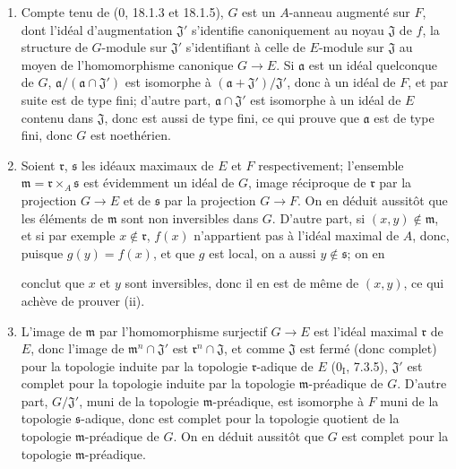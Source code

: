 \begin{enumerate}
  \item[(i)] Compte tenu de ($0$, 18.1.3 et 18.1.5), $G$ est un $A$-anneau augmenté sur $F$, dont l'idéal d'augmentation $\mathfrak J'$ s'identifie canoniquement au noyau $\mathfrak J$ de $f$, la structure de $G$-module sur $\mathfrak J'$ s'identifiant à celle de $E$-module sur $\mathfrak J$ au moyen de l'homomorphisme canonique $G\to E$. Si $\mathfrak a$ est un idéal quelconque de $G$, $\mathfrak a/(\mathfrak a\cap\mathfrak J')$ est isomorphe à $(\mathfrak a+\mathfrak J')/\mathfrak J'$, donc à un idéal de $F$, et par suite est de type fini; d'autre part, $\mathfrak a\cap\mathfrak J'$ est isomorphe à un idéal de $E$ contenu dans $\mathfrak J$, donc est aussi de type fini, ce qui prouve que $\mathfrak a$ est de type fini, donc $G$ est noethérien.
  \item[(ii)] Soient $\mathfrak r$, $\mathfrak s$ les idéaux maximaux de $E$ et $F$ respectivement; l'ensemble $\mathfrak m=\mathfrak r\times_A\mathfrak s$ est évidemment un idéal de $G$, image réciproque de $\mathfrak r$ par la projection $G\to E$ et de $\mathfrak s$ par la projection $G\to F$. On en déduit aussitôt que les éléments de $\mathfrak m$ sont non inversibles dans $G$. D'autre part, si $(x,y)\notin\mathfrak m$, et si par exemple $x\notin\mathfrak r$, $f(x)$ n'appartient pas à l'idéal maximal de $A$, donc, puisque $g(y)=f(x)$, et que $g$ est local, on a aussi $y\notin\mathfrak s$; on en


conclut que $x$ et $y$ sont inversibles, donc il en est de même de $(x,y)$, ce qui achève de prouver (ii).
  \item[(iii)] L'image de $\mathfrak m$ par l'homomorphisme surjectif $G\to E$ est l'idéal maximal $\mathfrak r$ de $E$, donc l'image de $\mathfrak m^n\cap\mathfrak J'$ est $\mathfrak r^n\cap\mathfrak J$, et comme $\mathfrak J$ est fermé (donc complet) pour la topologie induite par la topologie $\mathfrak r$-adique de $E$ ($0_{\mathrm I}$, 7.3.5), $\mathfrak J'$ est complet pour la topologie induite par la topologie $\mathfrak m$-préadique de $G$. D'autre part, $G/\mathfrak J'$, muni de la topologie $\mathfrak m$-préadique, est isomorphe à $F$ muni de la topologie $\mathfrak s$-adique, donc est complet pour la topologie quotient de la topologie $\mathfrak m$-préadique de $G$. On en déduit aussitôt que $G$ est complet pour la topologie $\mathfrak m$-préadique.
\end{enumerate}

